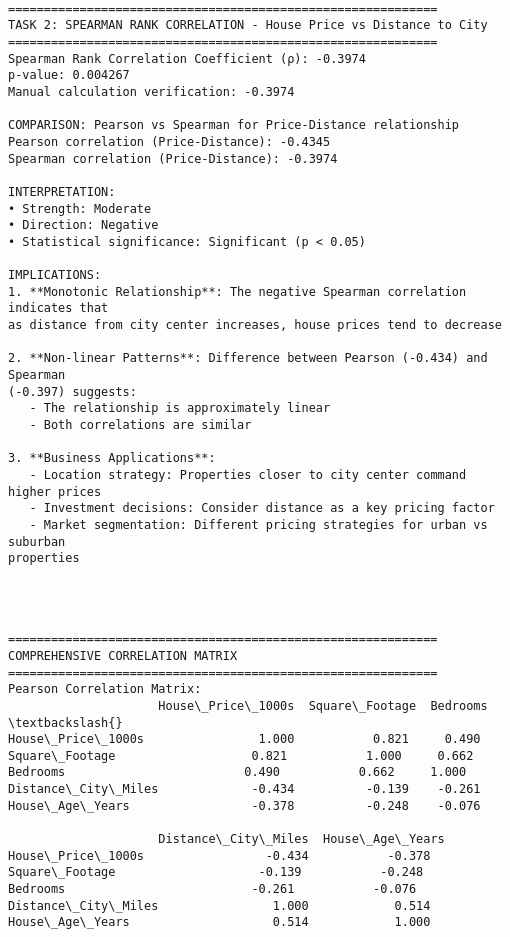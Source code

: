 \documentclass[11pt]{article}
\begin{document}
    \begin{Verbatim}[commandchars=\\\{\}]

============================================================
TASK 2: SPEARMAN RANK CORRELATION - House Price vs Distance to City
============================================================
Spearman Rank Correlation Coefficient (ρ): -0.3974
p-value: 0.004267
Manual calculation verification: -0.3974

COMPARISON: Pearson vs Spearman for Price-Distance relationship
Pearson correlation (Price-Distance): -0.4345
Spearman correlation (Price-Distance): -0.3974

INTERPRETATION:
• Strength: Moderate
• Direction: Negative
• Statistical significance: Significant (p < 0.05)

IMPLICATIONS:
1. **Monotonic Relationship**: The negative Spearman correlation indicates that
as distance from city center increases, house prices tend to decrease

2. **Non-linear Patterns**: Difference between Pearson (-0.434) and Spearman
(-0.397) suggests:
   - The relationship is approximately linear
   - Both correlations are similar

3. **Business Applications**:
   - Location strategy: Properties closer to city center command higher prices
   - Investment decisions: Consider distance as a key pricing factor
   - Market segmentation: Different pricing strategies for urban vs suburban
properties
    \end{Verbatim}

    \begin{center}
    \end{center}
    { \hspace*{\fill} \\}
    
    \begin{Verbatim}[commandchars=\\\{\}]

============================================================
COMPREHENSIVE CORRELATION MATRIX
============================================================
Pearson Correlation Matrix:
                     House\_Price\_1000s  Square\_Footage  Bedrooms  \textbackslash{}
House\_Price\_1000s                1.000           0.821     0.490
Square\_Footage                   0.821           1.000     0.662
Bedrooms                         0.490           0.662     1.000
Distance\_City\_Miles             -0.434          -0.139    -0.261
House\_Age\_Years                 -0.378          -0.248    -0.076

                     Distance\_City\_Miles  House\_Age\_Years
House\_Price\_1000s                 -0.434           -0.378
Square\_Footage                    -0.139           -0.248
Bedrooms                          -0.261           -0.076
Distance\_City\_Miles                1.000            0.514
House\_Age\_Years                    0.514            1.000
    \end{Verbatim}
\end{document}
